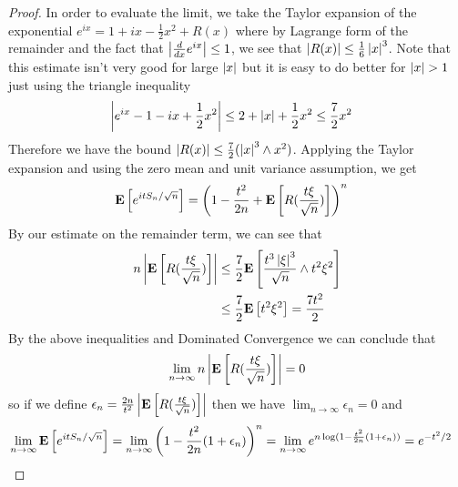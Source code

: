 \begin{proof}
In order to evaluate the limit, we take the Taylor expansion of the exponential $e^{ix} = 1 + i x -
\frac{1}{2}x^2 + R(x)$ where by Lagrange form of the remainder and the
fact that $\left \vert \frac{d}{dx} e^{ix} \right \vert \leq 1$, we
see that $\left \vert R(x) \right \vert \leq \frac{1}{6}\left \vert x \right \vert^3$.  Note that this
estimate isn't very good for large $\left \vert x \right \vert$ but it is easy to do
better for $\left \vert x \right \vert > 1$ just using the triangle inequality
\begin{align*}
\left \vert e^{ix} - 1 - ix + \frac{1}{2}x^2 \right \vert &\leq 2 + \left \vert x \right \vert +
\frac{1}{2}x^2 \leq \frac{7}{2}x^2
\end{align*}
Therefore we have the bound $\left \vert R(x) \right \vert \leq \frac{7}{2}(\left \vert x \right \vert^3
\wedge x^2)$.  Applying the Taylor expansion and using the zero mean
and unit variance assumption, we get
\begin{align*}
\textbf{E}\left[e^{itS_n/\sqrt{n}}\right] &= \left(1 - \frac{t^2}{2n} + \textbf{E}\left[R(\frac{t\xi}{\sqrt{n}})\right]\right)^n
\end{align*}
By our estimate on the remainder term, we can see that
\begin{align*}
n \left \vert \textbf{E}\left[R(\frac{t\xi}{\sqrt{n}})\right] \right \vert &\leq
\frac{7}{2}\textbf{E}\left[\frac{t^3\left \vert \xi \right \vert^3}{\sqrt{n}} \wedge t^2
  \xi^2\right] \\
&\leq \frac{7}{2} \textbf{E}\left[ t^2
  \xi^2\right] = \frac{7t^2}{2} 
\end{align*}
By the above inequalities and Dominated Convergence we can
conclude that 
\begin{align*}
\lim_{n \to \infty} n
\left \vert \textbf{E}\left[R(\frac{t\xi}{\sqrt{n}})\right] \right \vert = 0
\end{align*}
so if we define $\epsilon_n = \frac{2n}{t^2}
\left \vert \textbf{E}\left[R(\frac{t\xi}{\sqrt{n}})\right] \right \vert$ then we have $\lim_{n
  \to \infty} \epsilon_n = 0$ and 
\begin{align*}
\lim_{n \to \infty} \textbf{E}\left[e^{itS_n/\sqrt{n}}\right] &= \lim_{n \to 
  \infty} \left(1 - \frac{t^2}{2n} (1 + \epsilon_n) \right)^n =\lim_{n \to 
  \infty}  e^{n \log(1 - \frac{t^2}{2n} (1 + \epsilon_n))} =
e^{-t^2/2}
\end{align*}
\end{proof}

